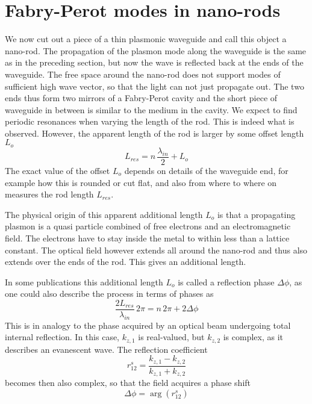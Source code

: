 

\section{Fabry-Perot modes in nano-rods}

We now cut out a piece of  a thin plasmonic waveguide and call this object a nano-rod. The propagation of the plasmon mode along the waveguide is the same as in the preceding section, but now the wave is reflected back at the ends of the waveguide. The free space around the nano-rod does not support modes of sufficient high wave vector, so that the light can not just propagate out. The two ends thus form two mirrors of a Fabry-Perot cavity and the short piece of waveguide in between is similar to the medium in the cavity. We expect to find periodic resonances when varying the length of the rod. This is indeed what is observed. However, the apparent length of the rod is larger by some offset length $L_o$
\begin{equation}
  L_{res} = n \, \frac{\lambda_{in}}{2} + L_{o}
\end{equation}
The exact value of the offset  $L_o$ depends on details of the waveguide end, for example how this is rounded or cut flat, and also from where to where on measures the rod length $L_{res}$.

The physical origin of this apparent additional length  $L_o$ is that a propagating plasmon is a quasi particle combined of free electrons and an electromagnetic field. The electrons have to stay inside the metal to within less than a lattice constant. The optical field however extends all around the nano-rod and thus also extends over the ends of the rod. This gives an additional length.

In some publications this additional length $L_o$ is called a reflection phase $\Delta \phi$, as one could also describe the process in terms of phases as
\begin{equation}
  \frac{2 L_{res}}{\lambda_{in}} \, 2 \pi = n \, 2 \pi + 2 \Delta \phi
\end{equation}
This is in analogy to the phase acquired by an optical beam undergoing total internal reflection. In this case, $k_{z,1}$ is real-valued, but $k_{z,2}$ is complex, as it describes an evanescent wave. The reflection coefficient 
\begin{equation}
  r_{12}^s =  \frac{k_{z,1} - k_{z,2}}{k_{z,1} + k_{z,2}}  
\end{equation}
becomes then also complex, so that the field acquires a phase shift 
\begin{equation}
  \Delta \phi = \arg (r_{12}^s)
\end{equation}



